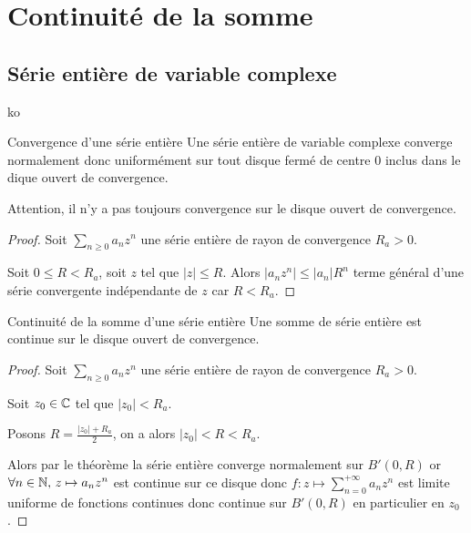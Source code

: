 \section{Continuité de la somme }
\subsection{Série entière de variable complexe }

ko

\lvspace 
\lvspace 
\begin{theoreme}{Convergence d'une série entière}{}
    Une série entière de variable complexe converge normalement donc uniformément sur tout disque 
    fermé de centre $0$ inclus dans le dique ouvert de convergence. 
\end{theoreme}

\begin{remarque}
    Attention, il n'y a pas toujours convergence sur le disque ouvert de convergence. 
\end{remarque}

\begin{proof}
    Soit $\sum_{n \geqslant 0} a_n z^n$ une série entière de rayon de convergence $R_a > 0$.

    Soit $0 \leqslant R < R_a$, soit $z$ tel que $|z| \leqslant R$. Alors 
    $|a_n z^n| \leqslant |a_n| R^n$ terme général d'une série convergente indépendante de $z$ 
    car $R < R_a$.
\end{proof}

\begin{corollaire}{Continuité de la somme d'une série entière}{}
    Une somme de série entière est continue sur le disque ouvert de convergence.
\end{corollaire}


\begin{proof}
    Soit $\sum_{n \geqslant 0} a_n z^n$ une série entière de rayon de convergence $R_a > 0$.

    Soit $z_0 \in \mathbb{C}$ tel que $|z_0| < R_a$.

    Posons $\displaystyle R = \frac{|z_0| + R_a }{2 }$, on a alors $|z_0| < R < R_a$.

    Alors par le théorème la série entière converge normalement sur $B'(0, R)$ 
    or $\forall n \in \mathbb{N}, \, z \mapsto a_n z^n$ est continue sur ce disque donc 
    $\displaystyle f : z \mapsto \sum_{n = 0}^{+\infty} a_n z^n$ est limite uniforme de fonctions continues 
    donc continue sur $B'(0, R)$ en particulier en $z_0$.


\end{proof}




